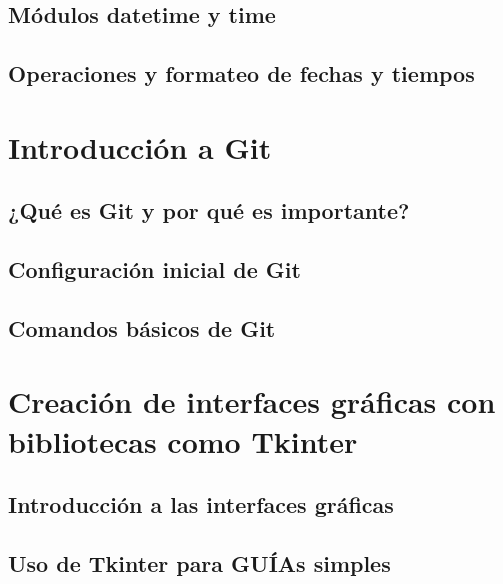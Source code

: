 \documentclass{article}
\begin{document}
\subsection{Módulos datetime y time}
\subsection{Operaciones y formateo de fechas y tiempos}

\section{Introducción a Git}

\subsection{¿Qué es Git y por qué es importante?}
\subsection{Configuración inicial de Git}
\subsection{Comandos básicos de Git}

\section{Creación de interfaces gráficas con bibliotecas como Tkinter}

\subsection{Introducción a las interfaces gráficas}
\subsection{Uso de Tkinter para GUÍAs simples}
\end{document}

